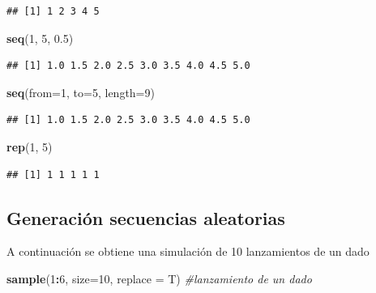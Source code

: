 \documentclass[]{book}
\newenvironment{Shaded}{\begin{snugshade}}{\end{snugshade}}
\newcommand{\KeywordTok}[1]{\textcolor[rgb]{0.13,0.29,0.53}{\textbf{#1}}}
\newcommand{\DataTypeTok}[1]{\textcolor[rgb]{0.13,0.29,0.53}{#1}}
\newcommand{\DecValTok}[1]{\textcolor[rgb]{0.00,0.00,0.81}{#1}}
\newcommand{\FloatTok}[1]{\textcolor[rgb]{0.00,0.00,0.81}{#1}}
\newcommand{\CommentTok}[1]{\textcolor[rgb]{0.56,0.35,0.01}{\textit{#1}}}
\newcommand{\OperatorTok}[1]{\textcolor[rgb]{0.81,0.36,0.00}{\textbf{#1}}}
\newcommand{\NormalTok}[1]{#1}
\begin{document}
\begin{verbatim}
## [1] 1 2 3 4 5
\end{verbatim}

\begin{Shaded}
\begin{Highlighting}[]
\KeywordTok{seq}\NormalTok{(}\DecValTok{1}\NormalTok{, }\DecValTok{5}\NormalTok{, }\FloatTok{0.5}\NormalTok{)}
\end{Highlighting}
\end{Shaded}

\begin{verbatim}
## [1] 1.0 1.5 2.0 2.5 3.0 3.5 4.0 4.5 5.0
\end{verbatim}

\begin{Shaded}
\begin{Highlighting}[]
\KeywordTok{seq}\NormalTok{(}\DataTypeTok{from=}\DecValTok{1}\NormalTok{, }\DataTypeTok{to=}\DecValTok{5}\NormalTok{, }\DataTypeTok{length=}\DecValTok{9}\NormalTok{)}
\end{Highlighting}
\end{Shaded}

\begin{verbatim}
## [1] 1.0 1.5 2.0 2.5 3.0 3.5 4.0 4.5 5.0
\end{verbatim}

\begin{Shaded}
\begin{Highlighting}[]
\KeywordTok{rep}\NormalTok{(}\DecValTok{1}\NormalTok{, }\DecValTok{5}\NormalTok{)}
\end{Highlighting}
\end{Shaded}

\begin{verbatim}
## [1] 1 1 1 1 1
\end{verbatim}

\subsection{Generación secuencias
aleatorias}\label{generacion-secuencias-aleatorias}

A continuación se obtiene una simulación de 10 lanzamientos de un dado

\begin{Shaded}
\begin{Highlighting}[]
\KeywordTok{sample}\NormalTok{(}\DecValTok{1}\OperatorTok{:}\DecValTok{6}\NormalTok{, }\DataTypeTok{size=}\DecValTok{10}\NormalTok{, }\DataTypeTok{replace =}\NormalTok{ T) }\CommentTok{#lanzamiento de un dado}
\end{Highlighting}
\end{Shaded}
\end{document}
